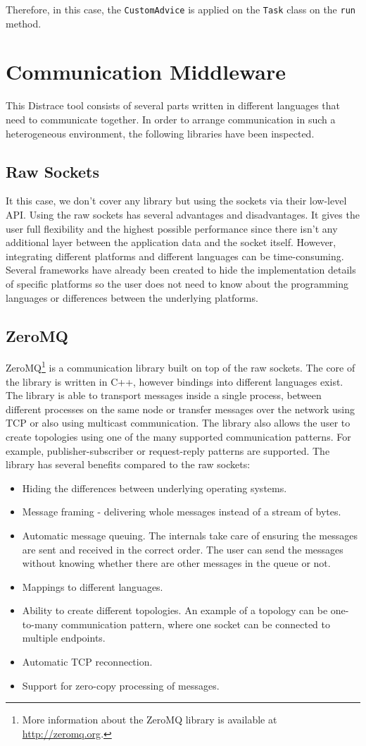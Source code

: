 Therefore, in this case, the \texttt{CustomAdvice} is applied on the \texttt{Task} class on the \texttt{run} method.
\section{Communication Middleware}
This Distrace tool consists of several parts written in different languages that need to communicate together. In order to arrange communication in such a heterogeneous environment, the following libraries have been inspected.
\subsection{Raw Sockets}
\label{raw_sockets}
It this case, we don't cover any library but using the sockets via their low-level API. Using the raw sockets has several advantages and disadvantages. It gives the user full flexibility and the highest possible performance since there isn't any additional layer between the application data and the socket itself. However, integrating different platforms and different languages can be time-consuming. Several frameworks have already been created to hide the implementation details of specific platforms so the user does not need to know about the programming languages or differences between the underlying platforms.
\subsection{ZeroMQ}
\label{zeromq}
ZeroMQ\footnote{More information about the ZeroMQ library is available at \url{http://zeromq.org}.} is a communication library built on top of the raw sockets. The core of the library is written in C++, however bindings into different languages exist. The library is able to transport messages inside a single process, between different processes on the same node or transfer messages over the network using TCP or also using multicast communication. The library also allows the user to create topologies using one of the many supported communication patterns. For example, publisher-subscriber or request-reply patterns are supported. The library has several benefits compared to the raw sockets:
\begin{itemize}
	\item Hiding the differences between underlying operating systems.
	\item Message framing - delivering whole messages instead of a stream of bytes.
	\item Automatic message queuing. The internals take care of ensuring the messages are sent and received in the correct order. The user can send the messages without knowing whether there are other messages in the queue or not.
	\item Mappings to different languages.
	\item Ability to create different topologies. An example of a topology can be one-to-many communication pattern, where one socket can be connected to multiple endpoints. 
	\item Automatic TCP reconnection.
	\item Support for zero-copy processing of messages.
\end{itemize}
